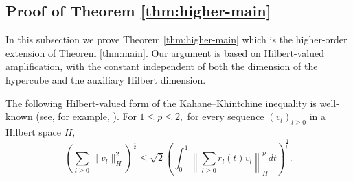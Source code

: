 \documentclass{amsart}
\numberwithin{equation}{section}
\theoremstyle{definition}
\theoremstyle{remark}
\newcommand{\1}{\mathbf 1}
\begin{document}
\subsection{Proof of Theorem \ref{thm:higher-main}} In this subsection  we prove Theorem \ref{thm:higher-main} which is the higher-order extension of Theorem \ref{thm:main}. Our argument is based on Hilbert-valued amplification, with the constant  independent of both the dimension of the hypercube and the auxiliary Hilbert dimension.

The following Hilbert-valued form of the Kahane--Khintchine inequality is well-known (see, for example,
\cite[Chapter~4]{LedouxTalagrand}). For $1\leq p\leq2,$ for every sequence $(v_l)_{l\geq0}$ in a Hilbert space $H,$
\begin{equation}\label{eq:higher-khintchine}
\left(\sum_{l\geq0}\|v_l\|_H^2\right)^{\frac{1}{2}}\leq \sqrt{2}\left(\int_0^1\left\|\sum_{l\geq0}r_l(t)v_l\right\|_H^pdt\right)^{\frac1p}.
\end{equation}
\end{document}
